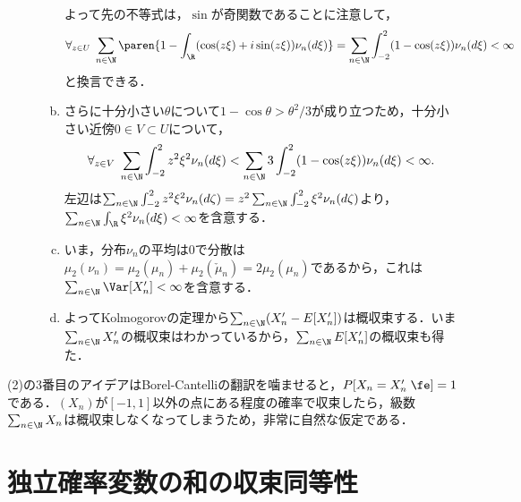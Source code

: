 \documentclass[uplatex,dvipdfmx]{jsreport}
\begin{document}
\begin{Proof}
\begin{description}
\begin{enumerate}[(a)]
            よって先の不等式は，$\sin$が奇関数であることに注意して，
            \[\forall_{z\in U}\;\sum_{n\in\N}\paren{1-\int_\R(\cos(z\xi)+i\sin(z\xi))\nu_n(d\xi)}=\sum_{n\in\N}\int^2_{-2}(1-\cos(z\xi))\nu_n(d\xi)<\infty\]
            と換言できる．
            \item さらに十分小さい$\theta$について$1-\cos\theta>\theta^2/3$が成り立つため，十分小さい近傍$0\in V\subset U$について，
            \[\forall_{z\in V}\;\sum_{n\in\N}\int^2_{-2}z^2\xi^2\nu_n(d\xi)<\sum_{n\in\N}3\int^2_{-2}(1-\cos(z\xi))\nu_n(d\xi)<\infty.\]
            左辺は$\sum_{n\in\N}\int^2_{-2}z^2\xi^2\nu_n(d\zeta)=z^2\sum_{n\in\N}\int^2_{-2}\xi^2\nu_n(d\zeta)$より，$\sum_{n\in\N}\int_\R\xi^2\nu_n(d\xi)<\infty$を含意する．
            \item いま，分布$\nu_n$の平均は$0$で分散は$\mu_2(\nu_n)=\mu_2(\mu_n)+\mu_2(\check{\mu}_n)=2\mu_2(\mu_n)$であるから，これは$\sum_{n\in\N}\Var[X_n']<\infty$を含意する．
            \item よってKolmogorovの定理から$\sum_{n\in\N}(X_n'-E[X_n'])$は概収束する．いま$\sum_{n\in\N}X_n'$の概収束はわかっているから，$\sum_{n\in\N}E[X_n']$の概収束も得た．
        \end{enumerate}
    \end{description}
\end{Proof}
\begin{remarks}
    (2)の3番目のアイデアはBorel-Cantelliの翻訳を噛ませると，$P[X_n=X_n'\;\fe]=1$である．$(X_n)$が$[-1,1]$以外の点にある程度の確率で収束したら，級数$\sum_{n\in\N}X_n$は概収束しなくなってしまうため，非常に自然な仮定である．
\end{remarks}

\section{独立確率変数の和の収束同等性}
\end{document}
